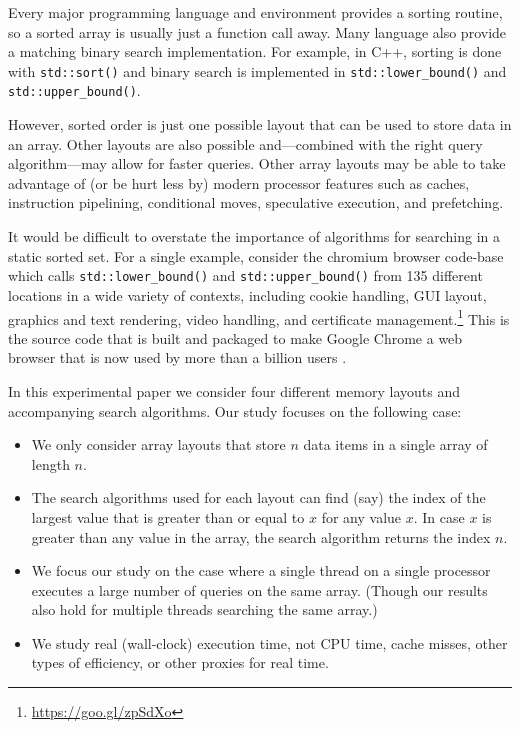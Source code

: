\documentclass{patmorin}
\begin{document}
Every major programming language and environment provides a sorting
routine, so a sorted array is usually just a function call away. Many
language also provide a matching binary search implementation.
For example, in C++, sorting is done with \texttt{std::sort()}
and binary search is implemented in \texttt{std::lower_bound()}
and \texttt{std::upper_bound()}.

However, sorted order is just one possible layout that can be used to
store data in an array. Other layouts are also possible and---combined
with the right query algorithm---may allow for faster queries.
Other array layouts may be able to take advantage of (or be hurt less
by) modern processor features such as caches, instruction pipelining,
conditional moves, speculative execution, and prefetching.

It would be difficult to overstate the importance of
algorithms for searching in a static sorted set.  For a
single example, consider the chromium browser code-base
which calls \texttt{std::lower_bound()} and
\texttt{std::upper_bound()} from 135 different locations
in a wide variety of contexts, including cookie handling, GUI
layout, graphics and text rendering, video handling, and certificate
management.\footnote{\url{https://goo.gl/zpSdXo}} This is the source code
that is built and packaged to make Google Chrome a web browser that is
now used by more than a billion users \cite{protalinksi:google}.


In this experimental paper we consider four different memory layouts and
accompanying search algorithms.  Our study focuses on the following case:

\begin{itemize}
\item We only consider array layouts that store $n$ data items in a
      single array of length $n$.

\item The search algorithms used for each layout can find (say) the
      index of the largest value that is greater than or equal to $x$
      for any value $x$. In case $x$ is greater than any value in the
      array, the search algorithm returns the index $n$.

\item We focus our study on the case where a single thread on a single
      processor executes a large number of queries on the same
      array. (Though our results also hold for multiple threads searching
      the same array.)

\item We study real (wall-clock) execution time, not CPU time, cache
      misses, other types of efficiency, or other proxies for real time.
\end{itemize}
\end{document}
